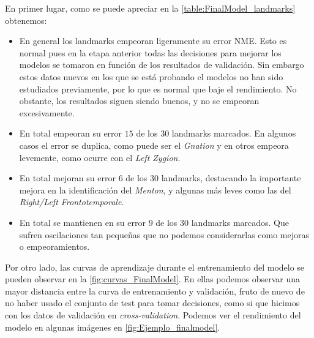         \medskip

        \noindent En primer lugar, como se puede apreciar en la \autoref{table:FinalModel_landmarks} obtenemos: 

        \begin{itemize}
            \item En general los landmarks empeoran ligeramente su error NME. Esto es normal pues en la etapa anterior todas las decisiones para mejorar los modelos se tomaron en función de los resultados de validación. Sin embargo estos datos nuevos en los que se está probando el modelos no han sido estudiados previamente, por lo que es normal que baje el rendimiento. No obstante, los resultados siguen siendo buenos, y no se empeoran excesivamente. 
            \item En total empeoran su error $15$ de los $30$ landmarks marcados. En algunos casos el error se duplica, como puede ser el \textit{Gnation} y en otros empeora levemente, como ocurre con el \textit{Left Zygion}. 
            \item En total mejoran su error $6$ de los $30$ landmarks, destacando la importante mejora en la identificación del \textit{Menton}, y algunas más leves como las del \textit{Right/Left Frontotemporale}.
            \item En total se mantienen en su error $9$ de los $30$ landmarks marcados. Que sufren oscilaciones tan pequeñas que no podemos considerarlas como mejoras o empeoramientos.
        \end{itemize}

        \medskip

        \noindent Por otro lado, las curvas de aprendizaje durante el entrenamiento del modelo se pueden observar en la \autoref{fig:curvas_FinalModel}. En ellas podemos observar una mayor distancia entre la curva de entrenamiento y validación, fruto de nuevo de no haber usado el conjunto de test para tomar decisiones, como si que hicimos con los datos de validación en \textit{cross-validation}. Podemos ver el rendimiento del modelo en algunas imágenes en \autoref{fig:Ejemplo_finalmodel}.

